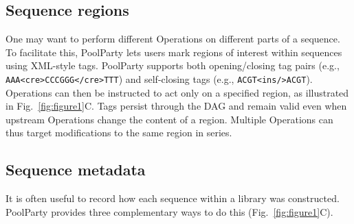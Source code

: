 \documentclass[pdflatex,sn-vancouver-num,referee,oneside]{sn-jnl}
\begin{document}
\subsection*{Sequence regions}\label{subsec:sequence-regions}

One may want to perform different Operations on different parts of a sequence. To facilitate this, PoolParty lets users mark regions of interest within sequences using XML-style tags. PoolParty supports both opening/closing tag pairs (e.g., \texttt{AAA<cre>CCCGGG</cre>TTT}) and self-closing tags (e.g., \texttt{ACGT<ins/>ACGT}). Operations can then be instructed to act only on a specified region, as illustrated in Fig.~\ref{fig:figure1}C. Tags persist through the DAG and remain valid even when upstream Operations change the content of a region. Multiple Operations can thus target modifications to the same region in series.

\subsection*{Sequence metadata}\label{subsec:sequence-metadata}

It is often useful to record how each sequence within a library was constructed. PoolParty provides three complementary ways to do this (Fig.~\ref{fig:figure1}C).
\end{document}

